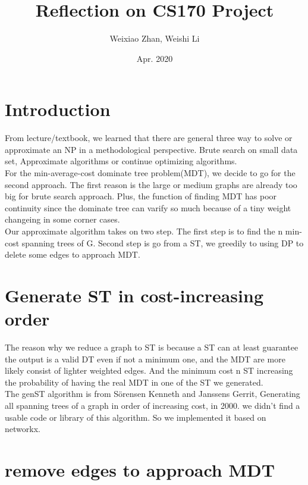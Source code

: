 \documentclass[12pt, a4paper]{article}
\title{Reflection on CS170 Project}
\author{Weixiao Zhan, Weishi Li}
\date{Apr. 2020}
\begin{document}
\maketitle
\clearpage

\section*{Introduction}
From lecture/textbook, we learned that there are general three way to solve or approximate an NP in a methodological perspective.
Brute search on small data set, Approximate algorithms or continue optimizing algorithms.\\
For the min-average-cost dominate tree problem(MDT), we decide to go for the second approach. The first reason is the large or medium graphs are already too big for brute search approach.
Plus, the function of finding MDT has poor continuity since the dominate tree can varify so much because of a tiny weight changeing in some corner cases.\\
Our approximate algorithm takes on two step. The first step is to find the n min-cost spanning trees of G. Second step is go from a ST, we greedily to using DP to delete some edges to approach MDT.

\section*{Generate ST in cost-increasing order}
The reason why we reduce a graph to ST is because a ST can at least guarantee the output is a valid DT even if not a minimum one, and the MDT are more likely consist of lighter weighted edges.
And the minimum cost n ST increasing the probability of having the real MDT in one of the ST we generated.\\
The genST algorithm is from Sörensen Kenneth and Janssens Gerrit, Generating all spanning trees of a graph in order of increasing cost, in 2000. we didn't find a usable code or library of this algorithm.
So we implemented it based on networkx.

\section*{remove edges to approach MDT}
\end{document}
